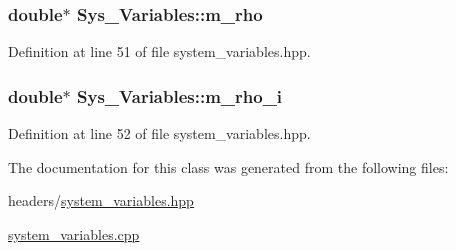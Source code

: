 \subsubsection[{\texorpdfstring{m\+\_\+rho}{m_rho}}]{\setlength{\rightskip}{0pt plus 5cm}double$\ast$ Sys\+\_\+\+Variables\+::m\+\_\+rho\hspace{0.3cm}{\ttfamily [protected]}}\hypertarget{class_sys___variables_a8c8fadb243470c79fa92e0b4073bc3ab}{}\label{class_sys___variables_a8c8fadb243470c79fa92e0b4073bc3ab}


Definition at line 51 of file system\+\_\+variables.\+hpp.

\subsubsection[{\texorpdfstring{m\+\_\+rho\+\_\+i}{m_rho_i}}]{\setlength{\rightskip}{0pt plus 5cm}double$\ast$ Sys\+\_\+\+Variables\+::m\+\_\+rho\+\_\+i\hspace{0.3cm}{\ttfamily [protected]}}\hypertarget{class_sys___variables_a6e866fa63196938dd286f2ab7cbc26ac}{}\label{class_sys___variables_a6e866fa63196938dd286f2ab7cbc26ac}


Definition at line 52 of file system\+\_\+variables.\+hpp.



The documentation for this class was generated from the following files\+:\begin{DoxyCompactItemize}
\item 
headers/\hyperlink{system__variables_8hpp}{system\+\_\+variables.\+hpp}\item 
\hyperlink{system__variables_8cpp}{system\+\_\+variables.\+cpp}\end{DoxyCompactItemize}
